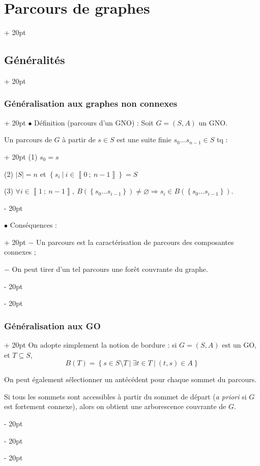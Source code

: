 \documentclass[a4paper, 12pt, twoside]{article}
\newcommand{\nset}[2]{\left\llbracket #1\ ;\ #2 \right\rrbracket}
\newcommand{\set}[1]{\left\{ #1 \right\}}
\newcommand{\abs}[1]{\left\lvert #1 \right\rvert}
\newcommand{\ind}[1][20pt]{\advance\leftskip + #1}
\newcommand{\deind}[1][20pt]{\advance\leftskip - #1}
\newenvironment{indt}[2][20pt]{#2 \par \ind[#1]}{\par \deind} %
\begin{document}
\begin{indt}{\section{Parcours de graphes}}
\begin{indt}{\subsection{Généralités}}
            \begin{indt}{\subsubsection{Généralisation aux graphes non connexes}}
                $\bullet$ Définition (parcours d'un GNO) : Soit $G = (S, A)$ un GNO.

                \begin{indt}{Un parcours de $G$ à partir de $s \in S$ est une suite finie $s_0 \ldots s_{n - 1} \in S$ tq :}
                    (1) $s_0 = s$

                    (2) $\abs S = n$ et $\set{s_i\ |\ i \in \nset 0 {n - 1}} = S$

                    (3) $\forall i \in \nset 1 {n - 1},\ B(\set{s_0 \ldots s_{i - 1}}) \neq \varnothing \Rightarrow s_i \in B(\set{s_0 \ldots s_{i - 1}})$.
                \end{indt}

                \vspace{6pt}
                
                \begin{indt}{$\bullet$ Conséquences :}
                    $-$ Un parcours est la caractérisation de parcours des composantes connexes ;

                    $-$ On peut tirer d'un tel parcours une forêt couvrante du graphe.
                \end{indt}
            \end{indt}

            \vspace{12pt}
            
            \begin{indt}{\subsubsection{Généralisation aux GO}}
                On adopte simplement la notion de bordure : si $G = (S, A)$ est un GO, et $T \subseteq S$,
                \[
                    B(T) = \set{s \in S \setminus T\ |\ \exists t \in T\ |\ (t, s) \in A}
                \]

                On peut également sélectionner un antécédent pour chaque sommet du parcours.

                Si tous les sommets sont accessibles à partir du sommet de départ (\textit{a priori} si $G$ est fortement connexe), alors on obtient une arborescence couvrante de $G$.


\end{indt}
\end{indt}
\end{indt}
\end{document}
